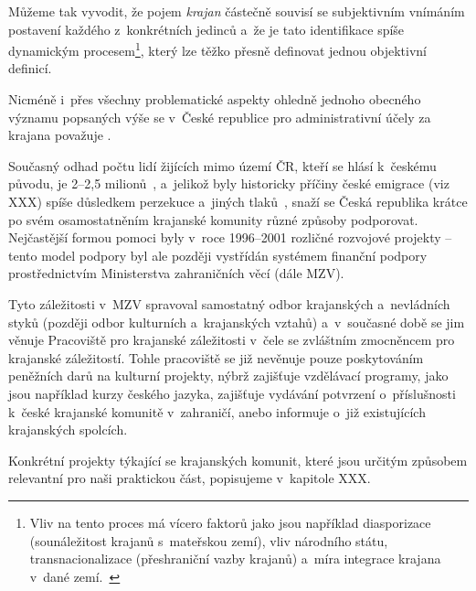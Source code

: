 Můžeme tak vyvodit, že pojem \emph{krajan} částečně souvisí se subjektivním vnímáním postavení každého z~konkrétních jedinců a~že je tato identifikace spíše dynamickým procesem\footnote{Vliv na tento proces má vícero faktorů jako jsou například diasporizace (sounáležitost krajanů s~mateřskou zemí), vliv národního státu, transnacionalizace (přeshraniční vazby krajanů) a~míra integrace krajana v~dané zemí.~\parencite{Broucek2017}}, který lze těžko přesně definovat jednou objektivní definicí.

Nicméně i~přes všechny problematické aspekty ohledně jednoho obecného významu popsaných výše se v~České republice pro administrativní účely za krajana považuje .~\parencite{Krajane-mv1}

Současný odhad počtu lidí žijících mimo území ČR, kteří se hlásí k~českému původu, je 2--2,5 milionů~\parencite{Krajane-mv2}, a~jelikož byly historicky příčiny české emigrace (viz XXX) spíše důsledkem perzekuce a~jiných tlaků~\parencite{Vaculik2009a}, snaží se Česká republika krátce po svém osamostatněním krajanské komunity různé způsoby podporovat. Nejčastější formou pomoci byly v~roce 1996--2001 rozličné rozvojové projekty -- tento model podpory byl ale později vystřídán systémem finanční podpory prostřednictvím Ministerstva zahraničních věcí (dále MZV).~\parencite{Broucek2009}

Tyto záležitosti v~MZV spravoval samostatný odbor krajanských a~nevládních styků (později odbor kulturních a~krajanských vztahů) a~v~současné době se jim věnuje Pracoviště pro krajanské záležitosti v~čele se zvláštním zmocněncem pro krajanské záležitostí. Tohle pracoviště se již nevěnuje pouze poskytováním peněžních darů na kulturní projekty, nýbrž zajišťuje vzdělávací programy, jako jsou například kurzy českého jazyka, zajišťuje vydávání potvrzení o~příslušnosti k~české krajanské komunitě v~zahraničí, anebo informuje o~již existujících krajanských spolcích.~\parencite{Krajane-mv3}

Konkrétní projekty týkající se krajanských komunit, které jsou určitým způsobem relevantní pro naši praktickou část, popisujeme v~kapitole XXX.
